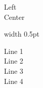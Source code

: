 \documentclass{article}
\begin{document}
\begin{tcolorbox}[sharp corners, boxsep=0pt, left=0pt, right=0pt, top=0pt, bottom=0pt]
\begin{minipage}[c]{100pt}
Left\\Center
\end{minipage}%
\vrule width 0.5pt%
\begin{minipage}[c]{200pt}
Line 1\\Line 2\\Line 3\\Line 4
\end{minipage}
\end{tcolorbox}
\end{document}
